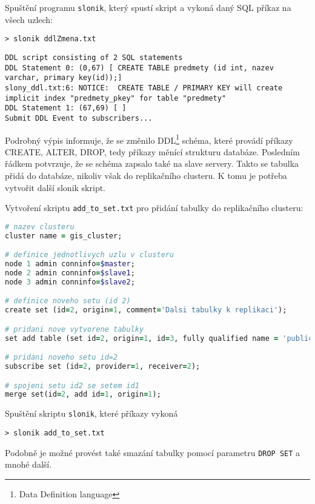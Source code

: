 Spuštění programu \texttt{slonik}, který spustí skript a vykoná daný SQL příkaz na všech uzlech: 

\begin{lstlisting}
> slonik ddlZmena.txt
\end{lstlisting}
\begin{lstlisting}[identifierstyle=\color{black},stringstyle=\color{black},keywordstyle=\color{black}]
DDL script consisting of 2 SQL statements
DDL Statement 0: (0,67) [ CREATE TABLE predmety (id int, nazev varchar, primary key(id));]
slony_ddl.txt:6: NOTICE:  CREATE TABLE / PRIMARY KEY will create implicit index "predmety_pkey" for table "predmety"
DDL Statement 1: (67,69) [ ]
Submit DDL Event to subscribers...
\end{lstlisting}


Podrobný výpis informuje, že se změnilo DDL\footnote{Data Definition language} schéma, které provádí příkazy CREATE, ALTER, DROP, tedy příkazy měnící strukturu databáze. Posledním řádkem potvrzuje, že se schéma zapsalo také na slave servery. Takto se tabulka přidá do databáze, nikoliv však do replikačního clusteru. K tomu je potřeba vytvořit další slonik skript. 

Vytvoření skriptu \texttt{add\_to\_set.txt} pro přidání tabulky do replikačního clusteru:

\begin{lstlisting}[language=ruby]
# nazev clusteru
cluster name = gis_cluster;

# definice jednotlivych uzlu v clusteru
node 1 admin conninfo=$master;
node 2 admin conninfo=$slave1;
node 3 admin conninfo=$slave2;

# definice noveho setu (id 2)
create set (id=2, origin=1, comment='Dalsi tabulky k replikaci');

# pridani nove vytvorene tabulky
set add table (set id=2, origin=1, id=3, fully qualified name = 'public.predmet', comment='seznam predmetu');

# pridani noveho setu id=2
subscribe set (id=2, provider=1, receiver=2);

# spojeni setu id2 se setem id1
merge set(id=2, add id=1, origin=1);
\end{lstlisting}

Spuštění skriptu \texttt{slonik}, které příkazy vykoná

\begin{lstlisting}
> slonik add_to_set.txt
\end{lstlisting}

Podobně je možné provést také smazání tabulky pomocí parametru \texttt{DROP SET} a mnohé další. 

